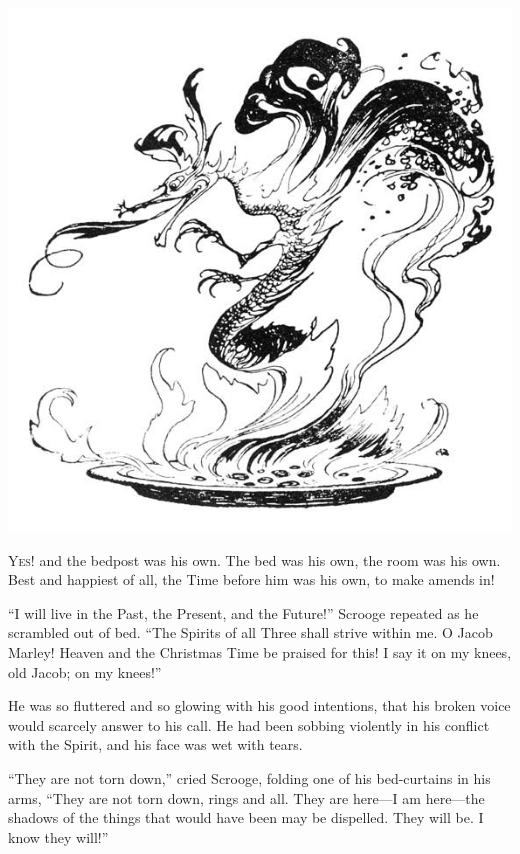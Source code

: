 \documentclass[paper=5.5in:8.5in,BCOR=15mm,twoside,DIV=15,headinclude=off,12pt,chapterprefix=off,openany,headings=huge]{scrbook} %
\begin{document}
\begin{minipage}[c]{\linewidth}
\includegraphics[width=\linewidth]{gs168}
\end{minipage}

\lettrine[loversize=.85]{Y}{es!} and the bedpost was his own. The bed was his own, the room was his own. Best and happiest of all, the Time before him was his own, to make amends in!

\enquote{I will live in the Past, the Present, and the Future!} Scrooge repeated as he scrambled out of bed. \enquote{The Spirits of all Three shall strive within me. O Jacob Marley! Heaven and the Christmas Time be praised for this! I say it on my knees, old Jacob; on my knees!}

He was so fluttered and so glowing with his good intentions, that his broken voice would scarcely answer to his call. He had been sobbing violently in his conflict with the Spirit, and his face was wet with tears.

\enquote{They are not torn down,} cried Scrooge, folding one of his bed-curtains in his arms, \enquote{They are not torn down, rings and all. They are here—I am here—the shadows of the things that would have been may be dispelled. They will be. I know they will!}
\end{document}
